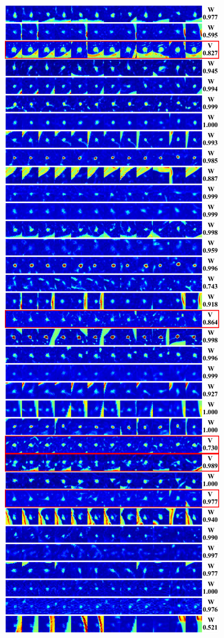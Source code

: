 \documentclass[onecolumn]{IEEEtran}
\begin{document}
\begin{figure}[H]
{\includegraphics[width=0.45\columnwidth]{./images/lidc-colornodules-iso3}
}
\end{figure}
\end{document}
